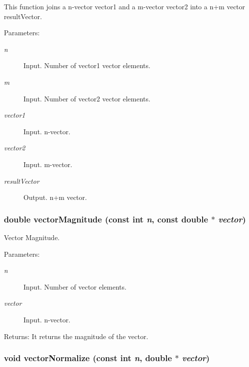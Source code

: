 This function joins a n-vector vector1 and a m-vector vector2 into a n+m vector resultVector.

\begin{Desc}
\item[Parameters:]
\begin{description}
\item[{\em n}]Input. Number of vector1 vector elements. \item[{\em m}]Input. Number of vector2 vector elements. \item[{\em vector1}]Input. n-vector. \item[{\em vector2}]Input. m-vector. \item[{\em resultVector}]Output. n+m vector. \end{description}
\end{Desc}
\hypertarget{group__a_gdf52065f80318dcc65c395566784fbc5}{
\subsubsection[vectorMagnitude]{\setlength{\rightskip}{0pt plus 5cm}double vectorMagnitude (const int {\em n}, \/  const double $\ast$ {\em vector})}}
\label{group__a_gdf52065f80318dcc65c395566784fbc5}


Vector Magnitude. 

\begin{Desc}
\item[Parameters:]
\begin{description}
\item[{\em n}]Input. Number of vector elements. \item[{\em vector}]Input. n-vector.\end{description}
\end{Desc}
\begin{Desc}
\item[Returns:]It returns the magnitude of the vector. \end{Desc}
\hypertarget{group__a_g0b322588b02d41e5bc4f37b292d15e16}{
\subsubsection[vectorNormalize]{\setlength{\rightskip}{0pt plus 5cm}void vectorNormalize (const int {\em n}, \/  double $\ast$ {\em vector})}}
\label{group__a_g0b322588b02d41e5bc4f37b292d15e16}


